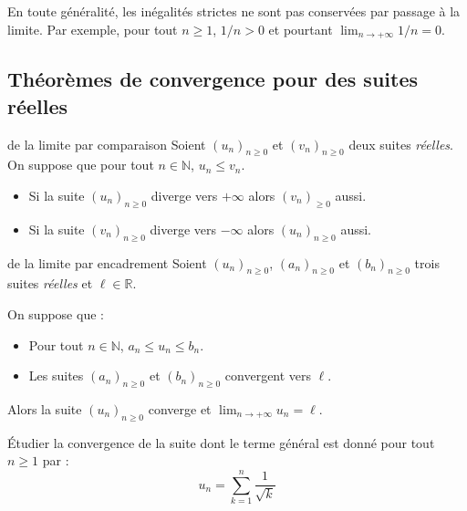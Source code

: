 \documentclass[french,11pt,twoside]{VcCours}
\begin{document}
\begin{Remarque}{} En toute généralité, les inégalités strictes ne sont pas conservées par passage à la limite. Par exemple, pour tout $n \geq 1$, $1/n > 0$ et pourtant $\lim_{n \rightarrow + \infty}1/n= 0.$
\end{Remarque}


\subsection{Théorèmes de convergence pour des suites réelles}

\begin{Theoreme}{de la limite par comparaison}
Soient $(u_n)_{n \geq 0}$ et $(v_n)_{n \geq 0}$ deux suites \emph{réelles}. On suppose que pour tout $n \in \mathbb{N}$, $u_n \leq v_n$.
\begin{itemize}
 \item Si la suite $(u_n)_{n \geq 0}$ diverge vers $+\infty$ alors  $(v_n)_{\geq 0}$ aussi. 
 \item Si la suite $(v_n)_{n \geq 0}$ diverge vers $-\infty$ alors $(u_n)_{n \geq 0}$ aussi.
 \end{itemize}
\end{Theoreme}

\begin{Theoreme}{de la limite par encadrement}
Soient $(u_n)_{n \geq 0}$, $(a_n)_{n \geq 0}$ et $(b_n)_{n \geq 0}$ trois suites \emph{réelles} et $\ell \in \mathbb{R}$.

\medskip

On suppose que :

\begin{itemize}
\item Pour tout $n \in \mathbb{N}$,  $a_n \leq u_n \leq b_n$.
\item Les suites $(a_n)_{n \geq 0}$ et $(b_n)_{n \geq 0}$ convergent vers $\ell$.
\end{itemize}

Alors la suite $(u_n)_{n \geq 0}$ converge et $\lim_{n \rightarrow + \infty} u_n = \ell$.
\end{Theoreme}

\begin{Exemple} Étudier la convergence de la suite dont le terme général est donné pour tout $n \geq 1$ par :
$$ u_n = \sum_{k=1}^n \frac{1}{\sqrt{k}}$$

\vspace{5cm}
\end{Exemple}
\end{document}
